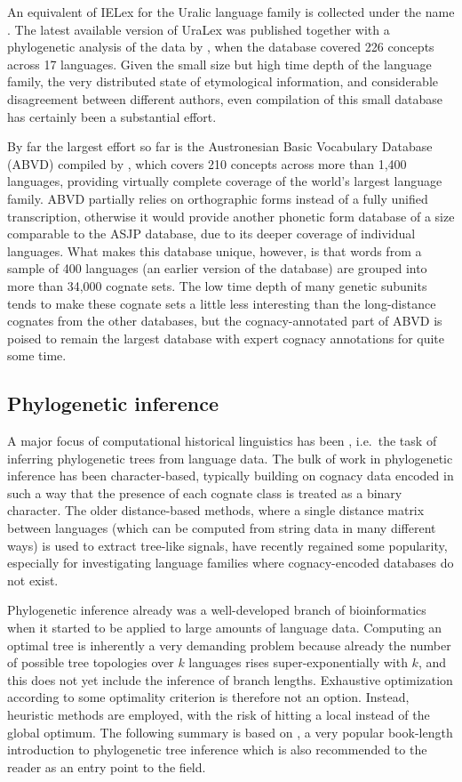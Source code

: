 An equivalent of IELex for the Uralic language family is collected under the name . The latest available version of UraLex was published together with a phylogenetic analysis of the data by \citet{syrjanen_ea_2013}, when the database covered 226 concepts across 17 languages. Given the small size but high time depth of the language family, the very distributed state of etymological information, and considerable disagreement between different authors, even compilation of this small database has certainly been a substantial effort.

By far the largest effort so far is the Austronesian Basic Vocabulary Database (ABVD) compiled by \citet{greenhill_ea_2008}, which covers 210 concepts across more than 1,400 languages, providing virtually complete coverage of the world's largest language family. ABVD partially relies on orthographic forms instead of a fully unified transcription, otherwise it would provide another phonetic form database of a size comparable to the ASJP database, due to its deeper coverage of individual languages. What makes this database unique, however, is that words from a sample of 400 languages (an earlier version of the database) are grouped into more than 34,000 cognate sets. The low time depth of many genetic subunits tends to make these cognate sets a little less interesting than the long-distance cognates from the other databases, but the cognacy-annotated part of ABVD is poised to remain the largest database with expert cognacy annotations for quite some time.

\subsection{Phylogenetic inference}
A major focus of computational historical linguistics has been , i.e.\ the task of inferring phylogenetic trees from language data. The bulk of work in phylogenetic inference has been character-based, typically building on cognacy data encoded in such a way that the presence of each cognate class is treated as a binary character. The older distance-based methods, where a single distance matrix between languages (which can be computed from string data in many different ways) is used to extract tree-like signals, have recently regained some popularity, especially for investigating language families where cognacy-encoded databases do not exist.

Phylogenetic inference already was a well-developed branch of bioinformatics when it started to be applied to large amounts of language data. Computing an optimal tree is inherently a very demanding problem because already the number of possible tree topologies over $k$ languages rises super-exponentially with $k$, and this does not yet include the inference of branch lengths. Exhaustive optimization according to some optimality criterion is therefore not an option. Instead, heuristic methods are employed, with the risk of hitting a local instead of the global optimum. The following summary is based on \citet{felsenstein2004}, a very popular book-length introduction to phylogenetic tree inference which is also recommended to the reader as an entry point to the field.

